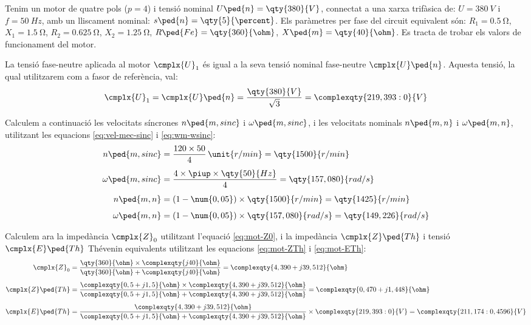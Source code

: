 \begin{exemple}\label{ex:CaractMotor}
	\addcontentsxms{\CaractMotor}	
    Tenim un motor de quatre pols ($p=4$) i tensió nominal $U\ped{n}=\qty{380}{V}$, connectat a una xarxa trifàsica de: $U=\qty{380}{V}$ i $f=\qty{50}{Hz}$, amb un lliscament nominal: $s\ped{n}=\qty{5}{\percent}$. Els paràmetres per fase del circuit equivalent són: $R_1=\qty{0,5}{\ohm}$, $X_1=\qty{1,5}{\ohm}$, $R_2=\qty{0,625}{\ohm}$, $X_2=\qty{1,25}{\ohm}$, $R\ped{Fe}=\qty{360}{\ohm}$, $X\ped{m}=\qty{40}{\ohm}$. Es tracta de trobar els valors de funcionament del motor.

    La tensió fase-neutre aplicada al motor $\cmplx{U}_1$ és igual a la seva tensió nominal  fase-neutre  $\cmplx{U}\ped{n}$. Aquesta tensió, la qual utilitzarem com a fasor de referència, val:
    \[
        \cmplx{U}_1 = \cmplx{U}\ped{n} = \frac{\qty{380}{V}}{\sqrt{3}} = \complexqty{219,393:0}{V}
    \]

    Calculem a continuació les velocitats síncrones $n\ped{m,sinc}$ i $\omega\ped{m,sinc}$, i les velocitats nominals $n\ped{m,n}$ i $\omega\ped{m,n}$, utilitzant les equacions \eqref{eq:vel-mec-sinc} i \eqref{eq:wm-wsinc}:
    \begin{align*}
        n\ped{m,sinc} &= \frac{120\times 50}{4} \, \unit{r/min} = \qty{1500}{r/min} \\[1ex]
        \omega\ped{m,sinc} &= \frac{4 \times\piup \times\qty{50}{Hz}}{4} =  \qty{157,080}{rad/s} \\[1ex]
        n\ped{m,n} &= (1-\num{0,05})\times \qty{1500}{r/min} = \qty{1425}{r/min} \\[1ex]
        \omega\ped{m,n} &= (1-\num{0,05}) \times\qty{157,080}{rad/s} = \qty{149,226}{rad/s}
    \end{align*}

    Calculem ara la impedància $\cmplx{Z}_0$ utilitzant l'equació \eqref{eq:mot-Z0}, i la impedància $\cmplx{Z}\ped{Th}$ i tensió $\cmplx{E}\ped{Th}$ Thévenin equivalents utilitzant les equacions \eqref{eq:mot-ZTh} i \eqref{eq:mot-ETh}:
     \begin{align*}
        \cmplx{Z}_0 &= \frac{\qty{360}{\ohm}\times\complexqty{j40}{\ohm}}{\qty{360}{\ohm}+\complexqty{j40}{\ohm}} = \complexqty{4,390+j39,512}{\ohm} \\[1ex]
        \cmplx{Z}\ped{Th} &= \frac{\complexqty{0,5+j1,5}{\ohm}\times\complexqty{4,390+j39,512}{\ohm}}
        {\complexqty{0,5+j1,5}{\ohm}+\complexqty{4,390+j39,512}{\ohm}} =  \complexqty{0,470+j1,448}{\ohm} \\[1ex]
        \cmplx{E}\ped{Th}  &= \frac{\complexqty{4,390+j39,512}{\ohm}}
        {\complexqty{0,5+j1,5}{\ohm}+\complexqty{4,390+j39,512}{\ohm}}\times\complexqty{219,393:0}{V} =  \complexqty{211,174:0,4596}{V}
    \end{align*}


\end{exemple}
